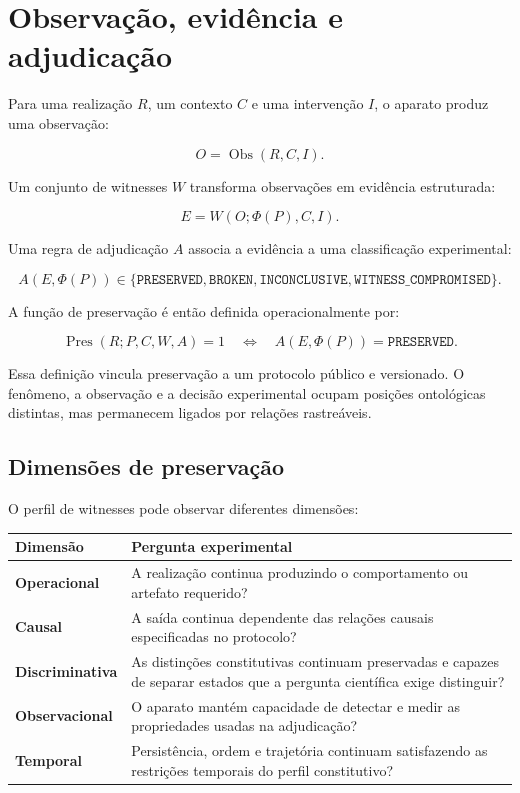 \documentclass[11pt,a4paper]{article}
\begin{document}
\section{Observação, evidência e adjudicação}

Para uma realização $R$, um contexto $C$ e uma intervenção $I$, o aparato produz uma
observação:

\[
O = \operatorname{Obs}(R,C,I).
\]

Um conjunto de witnesses $W$ transforma observações em evidência estruturada:

\[
E = W(O;\Phi(P),C,I).
\]

Uma regra de adjudicação $A$ associa a evidência a uma classificação experimental:

\[
A(E,\Phi(P)) \in
\{\texttt{PRESERVED},\texttt{BROKEN},\texttt{INCONCLUSIVE},
\texttt{WITNESS\_COMPROMISED}\}.
\]

A função de preservação é então definida operacionalmente por:

\[
\operatorname{Pres}(R;P,C,W,A)=1
\quad\Longleftrightarrow\quad
A(E,\Phi(P))=\texttt{PRESERVED}.
\]

Essa definição vincula preservação a um protocolo público e versionado. O fenômeno,
a observação e a decisão experimental ocupam posições ontológicas distintas, mas
permanecem ligados por relações rastreáveis.

\subsection{Dimensões de preservação}

O perfil de witnesses pode observar diferentes dimensões:

\begin{longtable}{>{\bfseries}p{3.2cm}p{10.8cm}}
\toprule
Dimensão & Pergunta experimental \\
\midrule
\endhead
Operacional &
A realização continua produzindo o comportamento ou artefato requerido? \\

Causal &
A saída continua dependente das relações causais especificadas no protocolo? \\

Discriminativa &
As distinções constitutivas continuam preservadas e capazes de separar estados que a
pergunta científica exige distinguir? \\

Observacional &
O aparato mantém capacidade de detectar e medir as propriedades usadas na adjudicação? \\

Temporal &
Persistência, ordem e trajetória continuam satisfazendo as restrições temporais do
perfil constitutivo? \\
\bottomrule
\end{longtable}
\end{document}
